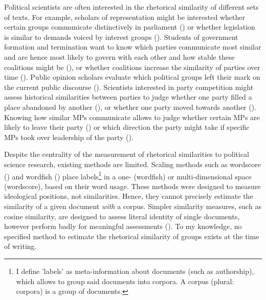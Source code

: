 \documentclass{article}
\begin{document}
Political scientists are often interested in the rhetorical similarity of different sets of texts. For example, scholars of representation might be interested whether certain groups communicate distinctively in parliament (\cite{Pitkin1967}) or whether legislation is similar to demands voiced by interest groups (\cite{Kluver2019}). Students of government formation and termination want to know which parties communicate most similar and are hence most likely to govern with each other and how stable these coalitions might be (\cite{Gamson1961, Grofman1994}), or whether coalitions increase the similarity of parties over time (\cite{Spoon2019}). Public opinion scholars evaluate which political groups left their mark on the current public discourse (\cite{Wagner2017, Slothuus2010k}). Scientists interested in party competition might assess historical similarities between parties to judge whether one party filled a place abandoned by another (\cite{Kitschelt1986}), or whether one party moved towards another (\cite{Downs1957, Meguid2005b}). Knowing how similar MPs communicate allows to judge whether certain MPs are likely to leave their party (\cite{Hirschman1970}) or which direction the party might take if specific MPs took over leadership of the party (\cite{Fernandez-Vazquez2016}).\par

Despite the centrality of the measurement of rhetorical similarities to political science research, existing methods are limited. Scaling methods such as wordscore (\cite{Laver2003}) and wordfish (\cite{Slapin2008}) place labels\footnote{I define 'labels' as meta-information about documents (such as authorship), which allows to group said documents into corpora. A corpus (plural: corpora) is a group of documents.} in a one- (wordfish) or multi-dimensional space (wordscore), based on their word usage. These methods were designed to measure ideological positions, not similarities. Hence, they cannot precisely estimate the similarity of a given document \textit{with} a corpus. Simpler similarity measures, such as cosine similarity, are designed to assess literal identity of single documents, however perform badly for meaningful assessments (\cite{Prasetya2018}). To my knowledge, no specified method to estimate the rhetorical similarity of groups exists at the time of writing.\par
\end{document}
